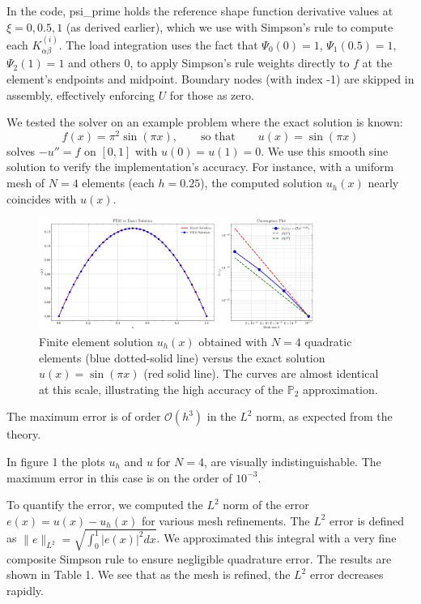 \documentclass[a4paper,10pt]{article}
\begin{document}
In the code, psi\_prime holds the reference shape function derivative values at \(\xi=0,0.5,1\) (as derived earlier), which we use with Simpson's rule to compute each \(K^{(i)}_{\alpha\beta}\).
The load integration uses the fact that \(\Psi_0(0)=1\), \(\Psi_1(0.5)=1\), \(\Psi_2(1)=1\) and others 0, to apply Simpson's rule weights directly to \(f\) at the element's endpoints and midpoint.
Boundary nodes (with index -1) are skipped in assembly, effectively enforcing \(U\) for those as zero.

We tested the solver on an example problem where the exact solution is known:
\[
	f(x) = \pi^2 \sin(\pi x), \qquad \text{so that}\qquad u(x) = \sin(\pi x)
\]
solves \(-u''=f\) on \([0,1]\) with \(u(0)=u(1)=0\).
We use this smooth sine solution to verify the implementation's accuracy.
For instance, with a uniform mesh of \(N=4\) elements (each \(h=0.25\)), the computed solution \(u_h(x)\) nearly coincides with \(u(x)\).
\begin{figure}[H]
	\centering
	\includegraphics[width=0.8\textwidth]{figures/fem_solution_20_1.png}
	\caption{Finite element solution \(u_h(x)\) obtained with \(N=4\) quadratic elements (blue dotted-solid line) versus the exact solution \(u(x)=\sin(\pi x)\) (red solid line).
		The curves are almost identical at this scale, illustrating the high accuracy of the \(\mathbb{P}_2 \) approximation.}
\end{figure}
The maximum error is of order \(\mathcal{O}(h^3)\) in the \(L^2\) norm, as expected from the theory.

In figure 1 the plots \(u_h\) and \(u\) for \(N=4\), are visually indistinguishable.
The maximum error in this case is on the order of \(10^{-3}\).

To quantify the error, we computed the \(L^2\) norm of the error \(e(x)=u(x)-u_h(x)\) for various mesh refinements. The \(L^2\) error is defined as \(\|e\|_{L^2} = \sqrt{\int_0^1 |e(x)|^2 dx}\). We approximated this integral with a very fine composite Simpson rule to ensure negligible quadrature error. The results are shown in Table 1. We see that as the mesh is refined, the \(L^2\) error decreases rapidly.
\end{document}
